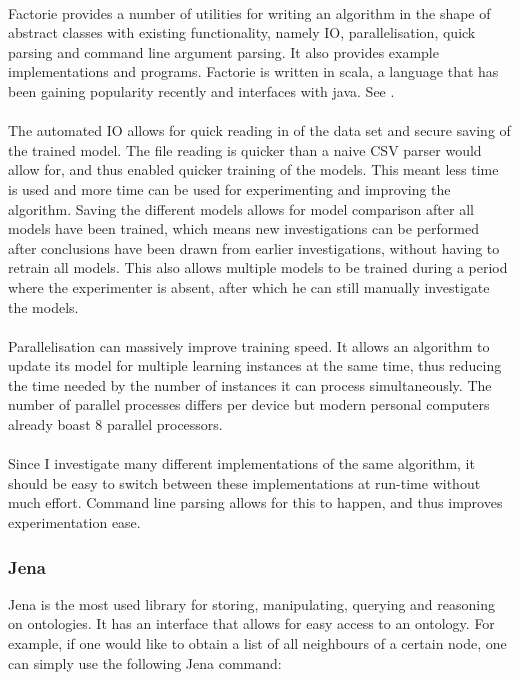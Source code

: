 \documentclass{article}
\begin{document}
 \paragraph{}
 Factorie provides a number of utilities for writing an algorithm in the shape of abstract classes with existing functionality, namely IO, parallelisation, quick parsing and command line argument parsing. It also provides example implementations and programs. Factorie is written in scala, a language that has been gaining popularity recently and interfaces with java. See \cite{scala}. 
 \paragraph{}
 The automated IO allows for quick reading in of the data set and secure saving of the trained model. The file reading is quicker than a naive CSV parser would allow for, and thus enabled quicker training of the models. This meant less time is used and more time can be used for experimenting and improving the algorithm. Saving the different models allows for model comparison after all models have been trained, which means new investigations can be performed after conclusions have been drawn from earlier investigations, without having to retrain all models. This also allows multiple models to be trained during a period where the experimenter is absent, after which he can still manually investigate the models.
 \paragraph{}
 Parallelisation can massively improve training speed. It allows an algorithm to update its model for multiple learning instances at the same time, thus reducing the time needed by the number of instances it can process simultaneously. The number of parallel processes differs per device but modern personal computers already boast 8 parallel processors.
 \paragraph{}
 Since I investigate many different implementations of the same algorithm, it should be easy to switch between these implementations at run-time without much effort. Command line parsing allows for this to happen, and thus improves experimentation ease.
 
 \subsubsection{Jena}
 Jena is the most used library for storing, manipulating, querying and reasoning on ontologies\cite{jena}. It has an interface that allows for easy access to an ontology. For example, if one would like to obtain a list of all neighbours of a certain node, one can simply use the following Jena command:
 
\end{document}
